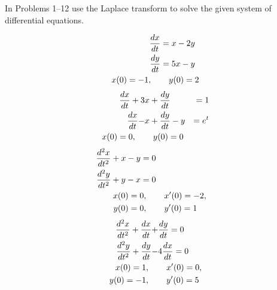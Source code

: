 \documentclass[chapter=7,section=6]{math252homework}
\begin{document}

In Problems 1--12 use the Laplace transform to solve the given system of differential equations.
\begin{problems}[start=3] %
	\problem \begin{equation*}
	\begin{aligned}
		\frac{dx}{dt} &= x-2y\\
		\frac{dy}{dt} &= 5x-y\\
		x(0)=-1, \mbox{{ }{ }{ }} & \mbox{{ }{ }{ }} y(0)=2
	\end{aligned}
	\end{equation*}
	\problem \begin{equation*}
	\begin{aligned}
		\frac{dx}{dt} + 3&x + \frac{dy}{dt} &= 1\\
		\frac{dx}{dt} -  &x + \frac{dy}{dt} - y &= e^{t}\\
		x(0)=0, \mbox{{ }{ }{ }} & \mbox{{ }{ }{ }} y(0)=0
	\end{aligned}
	\end{equation*}
	\setcounter{problemsi}{6}
	\problem \begin{equation*}
	\begin{aligned}
		\frac{d^{2}x}{dt^{2}} + x - y = 0\\
		\frac{d^{2}y}{dt^{2}} + y - x = 0\\
		x(0)=0, \mbox{{ }{ }{ }} & \mbox{{ }{ }{ }} x'(0)=-2,\\
		y(0)=0, \mbox{{ }{ }{ }} & \mbox{{ }{ }{ }} y'(0)=1
	\end{aligned}
	\end{equation*}
	\problem \begin{equation*}
	\begin{aligned}
		\frac{d^{2}x}{dt^{2}} + \frac{dx}{dt} + &\frac{dy}{dt} = 0\\
		\frac{d^{2}y}{dt^{2}} + \frac{dy}{dt} - &4\frac{dx}{dt} = 0\\
		x(0)=1, \mbox{{ }{ }{ }} & \mbox{{ }{ }{ }} x'(0)=0,\\
		y(0)=-1, \mbox{{ }{ }{ }} & \mbox{{ }{ }{ }} y'(0)=5
	\end{aligned}
	\end{equation*}
\end{problems}

\setcounter{chapter}{4}
\setcounter{section}{9}
\end{document}
